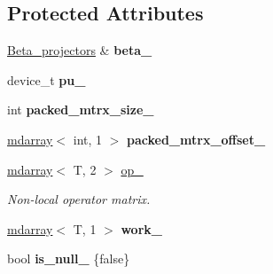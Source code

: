 \subsection*{Protected Attributes}
\begin{DoxyCompactItemize}
\item 
\hypertarget{classsirius_1_1_non__local__operator_a9d69c4aab6be290dbbd820b140c8225c}{}\hyperlink{classsirius_1_1_beta__projectors}{Beta\+\_\+projectors} \& {\bfseries beta\+\_\+}\label{classsirius_1_1_non__local__operator_a9d69c4aab6be290dbbd820b140c8225c}

\item 
\hypertarget{classsirius_1_1_non__local__operator_a8051f420d8bc6db3b7e81bcb1bde6b1f}{}device\+\_\+t {\bfseries pu\+\_\+}\label{classsirius_1_1_non__local__operator_a8051f420d8bc6db3b7e81bcb1bde6b1f}

\item 
\hypertarget{classsirius_1_1_non__local__operator_aa9160969f5712b32711b3ab91516406b}{}int {\bfseries packed\+\_\+mtrx\+\_\+size\+\_\+}\label{classsirius_1_1_non__local__operator_aa9160969f5712b32711b3ab91516406b}

\item 
\hypertarget{classsirius_1_1_non__local__operator_a8b5e4b51e94721fddb502c9e0fa0384a}{}\hyperlink{classsddk_1_1mdarray}{mdarray}$<$ int, 1 $>$ {\bfseries packed\+\_\+mtrx\+\_\+offset\+\_\+}\label{classsirius_1_1_non__local__operator_a8b5e4b51e94721fddb502c9e0fa0384a}

\item 
\hyperlink{classsddk_1_1mdarray}{mdarray}$<$ T, 2 $>$ \hyperlink{classsirius_1_1_non__local__operator_ac9e033a0db6c48d61946dc68bfe7285d}{op\+\_\+}
\begin{DoxyCompactList}\small\item\em Non-\/local operator matrix. \end{DoxyCompactList}\item 
\hypertarget{classsirius_1_1_non__local__operator_adefd33ee8351f5e62e91efd23aba107c}{}\hyperlink{classsddk_1_1mdarray}{mdarray}$<$ T, 1 $>$ {\bfseries work\+\_\+}\label{classsirius_1_1_non__local__operator_adefd33ee8351f5e62e91efd23aba107c}

\item 
\hypertarget{classsirius_1_1_non__local__operator_a5720ea94304ca7563c3e632d7057391a}{}bool {\bfseries is\+\_\+null\+\_\+} \{false\}\label{classsirius_1_1_non__local__operator_a5720ea94304ca7563c3e632d7057391a}

\end{DoxyCompactItemize}


